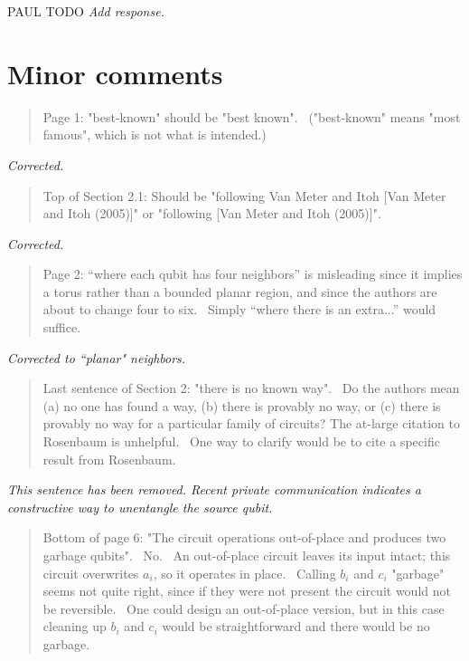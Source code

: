 \documentclass{article}
\theoremstyle{plain} \newtheorem{lemma}{Lemma}
\begin{document}
PAUL TODO
{\it Add response.}

\section{Minor comments}

\begin{quote}
Page 1: "best-known" should be "best known".  ("best-known" means
"most famous", which is not what is intended.)
\end{quote}

{\it Corrected.}

\begin{quote}
Top of Section 2.1: Should be "following Van Meter and Itoh [Van Meter
and Itoh (2005)]" or "following [Van Meter and Itoh (2005)]".
\end{quote}

{\it Corrected.}

\begin{quote}
Page 2: ``where each qubit has four neighbors'' is misleading since it
implies a torus rather than a bounded planar region, and since the authors
are about to change four to six.  Simply ``where there is an extra...''
would suffice.
\end{quote}

{\it Corrected to ``planar" neighbors.}

\begin{quote}
Last sentence of Section 2: "there is no known way".  Do the authors
mean (a) no one has found a way, (b) there is provably no way, or
(c) there is provably no way for a particular family of circuits? The
at-large citation to Rosenbaum is unhelpful.  One way to clarify would be
to cite a specific result from Rosenbaum.
\end{quote}

{\it This sentence has been removed.  Recent private communication indicates a constructive way to unentangle the source qubit.}

\begin{quote}
Bottom of page 6: "The circuit operations out-of-place and produces
two garbage qubits".  No.  An out-of-place circuit leaves its input intact;
this circuit overwrites $a_i$, so it operates in place.  Calling $b_i$ and
$c_i$ "garbage" seems not quite right, since if they were not present the
circuit would not be reversible.  One could design an out-of-place version,
but in this case cleaning up $b_i$ and $c_i$ would be straightforward and
there would be no garbage.
\end{quote}
\end{document}
